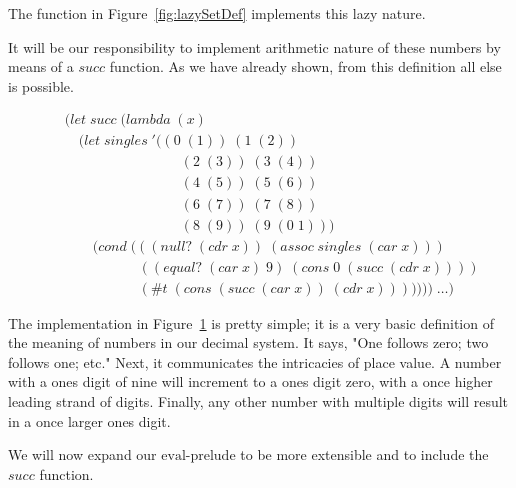 The function in Figure~\ref{fig:lazySetDef} implements this lazy nature.

It will be our responsibility to implement arithmetic nature of these numbers 
by means of a $succ$ function. As we have already shown, from this definition 
all else is possible.

\begin{figure}[htp]
\caption{}\label{fig:succDef}
\begin{align*}
& (let \; succ \; (lambda \; (x)
\\& \quad (let \; singles \; '((0 \; (1)) \; (1 \; (2)) \; 
\\& \qquad \qquad \qquad \qquad \; (2 \; (3)) \; (3 \; (4)) \; 
\\& \qquad \qquad \qquad \qquad \; (4 \; (5)) \; (5 \; (6)) \; 
\\& \qquad \qquad \qquad \qquad \; (6 \; (7)) \; (7 \; (8)) \; 
\\& \qquad \qquad \qquad \qquad \; (8 \; (9)) \; (9 \; (0 \; 1)))
\\& \qquad (cond \; (((null? \; (cdr \; x)) \; (assoc \; singles \; (car \; x)))
\\& \qquad \qquad \quad \; ((equal? \; (car \; x) \; 9) \; (cons \; 0 \; (succ \; (cdr \; x))))
\\& \qquad \qquad \quad \; (\#t \; (cons \; (succ \; (car \; x)) \; (cdr \; x))))))) \; \dots)
\end{align*}
\end{figure}

The implementation in Figure~\ref{fig:succDef} is pretty simple; it is a very
basic definition of the meaning of numbers in our decimal system. It says, "One
follows zero; two follows one; etc." Next, it communicates the intricacies of
place value. A number with a ones digit of nine will increment to a ones digit
zero, with a once higher leading strand of digits. Finally, any other number
with multiple digits will result in a once larger ones digit.

We will now expand our $\text{eval-prelude}$ to be more extensible and to include 
the $succ$ function.


